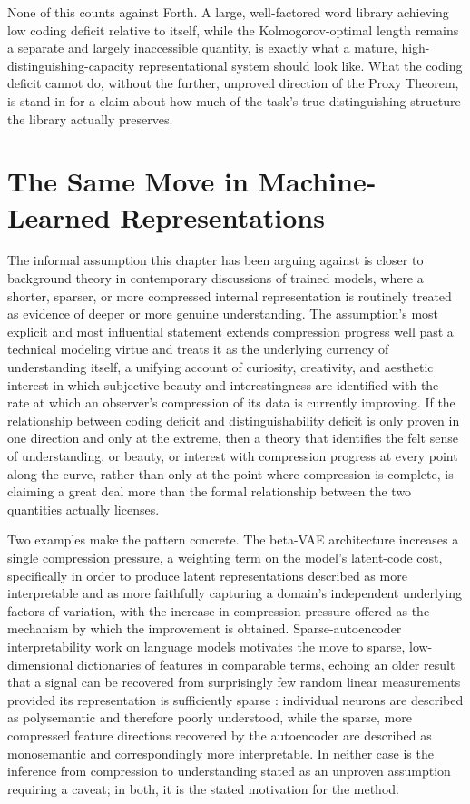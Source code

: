 None of this counts against Forth. A large, well-factored word library achieving low coding deficit relative to itself, while the Kolmogorov-optimal length remains a separate and largely inaccessible quantity, is exactly what a mature, high-distinguishing-capacity representational system should look like. What the coding deficit cannot do, without the further, unproved direction of the Proxy Theorem, is stand in for a claim about how much of the task's true distinguishing structure the library actually preserves.

\section{The Same Move in Machine-Learned Representations}

The informal assumption this chapter has been arguing against is closer to background theory in contemporary discussions of trained models, where a shorter, sparser, or more compressed internal representation is routinely treated as evidence of deeper or more genuine understanding. The assumption's most explicit and most influential statement extends compression progress well past a technical modeling virtue and treats it as the underlying currency of understanding itself, a unifying account of curiosity, creativity, and aesthetic interest in which subjective beauty and interestingness are identified with the rate at which an observer's compression of its data is currently improving. If the relationship between coding deficit and distinguishability deficit is only proven in one direction and only at the extreme, then a theory that identifies the felt sense of understanding, or beauty, or interest with compression progress at every point along the curve, rather than only at the point where compression is complete, is claiming a great deal more than the formal relationship between the two quantities actually licenses.

Two examples make the pattern concrete. The beta-VAE architecture increases a single compression pressure, a weighting term on the model's latent-code cost, specifically in order to produce latent representations described as more interpretable and as more faithfully capturing a domain's independent underlying factors of variation, with the increase in compression pressure offered as the mechanism by which the improvement is obtained. Sparse-autoencoder interpretability work on language models motivates the move to sparse, low-dimensional dictionaries of features in comparable terms, echoing an older result that a signal can be recovered from surprisingly few random linear measurements provided its representation is sufficiently sparse \cite{candestao2006}: individual neurons are described as polysemantic and therefore poorly understood, while the sparse, more compressed feature directions recovered by the autoencoder are described as monosemantic and correspondingly more interpretable. In neither case is the inference from compression to understanding stated as an unproven assumption requiring a caveat; in both, it is the stated motivation for the method.

